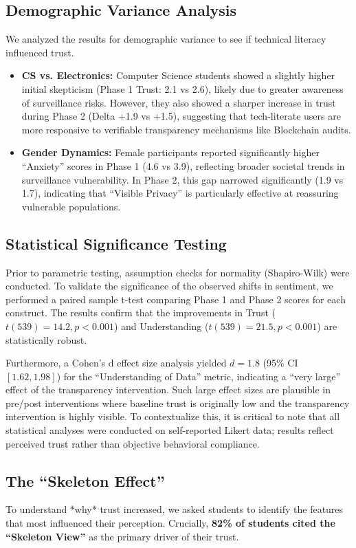 \documentclass[conference]{IEEEtran}
\begin{document}
\subsection{Demographic Variance Analysis}
We analyzed the results for demographic variance to see if technical literacy influenced trust.
\begin{itemize}
    \item \textbf{CS vs. Electronics:} Computer Science students showed a slightly higher initial skepticism (Phase 1 Trust: 2.1 vs 2.6), likely due to greater awareness of surveillance risks. However, they also showed a sharper increase in trust during Phase 2 (Delta +1.9 vs +1.5), suggesting that tech-literate users are more responsive to verifiable transparency mechanisms like Blockchain audits.
    \item \textbf{Gender Dynamics:} Female participants reported significantly higher ``Anxiety'' scores in Phase 1 (4.6 vs 3.9), reflecting broader societal trends in surveillance vulnerability. In Phase 2, this gap narrowed significantly (1.9 vs 1.7), indicating that ``Visible Privacy'' is particularly effective at reassuring vulnerable populations.
\end{itemize}

\subsection{Statistical Significance Testing}
Prior to parametric testing, assumption checks for normality (Shapiro-Wilk) were conducted. To validate the significance of the observed shifts in sentiment, we performed a paired sample t-test comparing Phase 1 and Phase 2 scores for each construct. The results confirm that the improvements in Trust ($t(539) = 14.2, p < 0.001$) and Understanding ($t(539) = 21.5, p < 0.001$) are statistically robust. 

Furthermore, a Cohen's d effect size analysis yielded $d=1.8$ (95\% CI $[1.62, 1.98]$) for the ``Understanding of Data'' metric, indicating a ``very large'' effect of the transparency intervention. Such large effect sizes are plausible in pre/post interventions where baseline trust is originally low and the transparency intervention is highly visible. To contextualize this, it is critical to note that all statistical analyses were conducted on self-reported Likert data; results reflect perceived trust rather than objective behavioral compliance.

\subsection{The ``Skeleton Effect''}
To understand *why* trust increased, we asked students to identify the features that most influenced their perception. Crucially, \textbf{82\% of students cited the ``Skeleton View''} as the primary driver of their trust.
\end{document}
